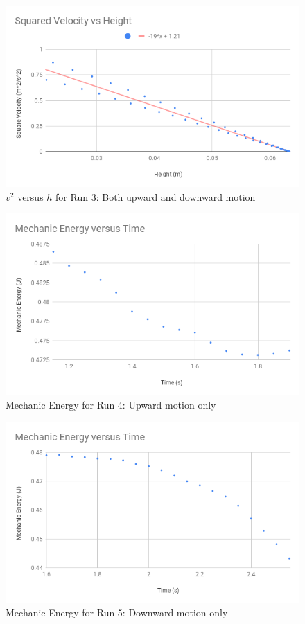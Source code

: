 \begin{figure}[ht]
    \centering
    \includegraphics[scale=0.71]{image/07-mechanic/v2-both.png}
    \caption{$v^{2}$ versus $h$ for Run 3: Both upward and downward motion}
    \label{figure:07.v2.3}
\end{figure}
\begin{figure}[ht]
    \centering
    \includegraphics[scale=0.71]{image/07-mechanic/energy-4.png}
    \caption{Mechanic Energy for Run 4: Upward motion only}
    \label{figure.07.run.4.e}
\end{figure}
\begin{figure}[ht]
    \centering
    \includegraphics[scale=0.71]{image/07-mechanic/energy-5.png}
    \caption{Mechanic Energy for Run 5: Downward motion only}
    \label{figure.07.run.5.e}
\end{figure}
